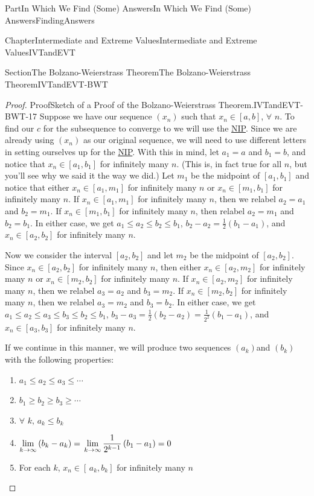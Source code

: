 \documentclass[oneside,10pt,]{book}
\numberwithin{equation}{part}
\begin{document}
\begin{partptx}{Part}{In Which We Find (Some) Answers}{}{In Which We Find (Some) Answers}{}{}{FindingAnswers}
\begin{chapterptx}{Chapter}{Intermediate and Extreme Values}{}{Intermediate and Extreme Values}{}{}{IVTandEVT}
\begin{sectionptx}{Section}{The Bolzano-Weierstrass Theorem}{}{The Bolzano-Weierstrass Theorem}{}{}{IVTandEVT-BWT}
\begin{proof}{Proof}{Sketch of a Proof of the Bolzano-Weierstrass Theorem.}{IVTandEVT-BWT-17}
Suppose we have our sequence \(\left(x_n\right)\) such that \(x_n\in[a,b]\), \(\forall\) \(n\). To find our \(c\) for the subsequence to converge to we will use the \hyperref[NIP]{NIP}. Since we are already using \(\left(x_n\right)\) as our original sequence, we will need to use different letters in setting ourselves up for the \hyperref[NIP]{NIP}. With this in mind, let \(a_1=a\) and \(b_1=b\), and notice that \(x_n\in[a_1,b_1]\) for infinitely many \(n\). (This is, in fact true for all \(n\), but you'll see why we said it the way we did.) Let \(m_1\) be the midpoint of \([a_1,b_1]\) and notice that either \(x_n\in[a_1,m_1]\) for infinitely many \(n\) or \(x_n\in[m_1,b_1]\) for infinitely many \(n\). If \(x_n\in[a_1,m_1]\) for infinitely many \(n\), then we relabel \(a_2=a_1\) and \(b_2=m_1\). If \(x_n\in[m_1,b_1]\) for infinitely many \(n\), then relabel \(a_2=m_1\) and \(b_2=b_1\). In either case, we get \(a_1\leq a_2\leq b_2\leq b_1\), \(b_2-a_2=\frac{1}{2}\left(b_1-a_1\right)\), and \(x_n\in[a_2,b_2]\) for infinitely many \(n\).%
\par
Now we consider the interval \([a_2,b_2]\) and let \(m_2\) be the midpoint of \([a_2,b_2]\). Since \(x_n\in[a_2,b_2]\) for infinitely many \(n\), then either \(x_n\in[a_2,m_2]\) for infinitely many \(n\) or \(x_n\in[m_2,b_2]\) for infinitely many \(n\). If \(x_n\in[a_2,m_2]\) for infinitely many \(n\), then we relabel \(a_3=a_2\) and \(b_3=m_2\). If \(x_n\in[m_2,b_2]\) for infinitely many \(n\), then we relabel \(a_3=m_2\) and \(b_3=b_2\). In either case, we get \(a_1\leq a_2\leq a_3\leq b_3\leq b_2\leq b_1\), \(b_3-a_3=\frac{1}{2}\left(b_2-a_2\right)=\frac{1}{2^2}\left(b_1-a_1\right)\), and \(x_n\in[a_3,b_3]\) for infinitely many \(n\).%
\par
If we continue in this manner, we will produce two sequences \(\left(a_k\right)\)and \(\left(b_k\right)\) with the following properties:%
\begin{enumerate}
\item{}\(\displaystyle a_1\leq a_2\leq a_3\leq\cdots\)%
\item{}\(\displaystyle b_1\geq b_2\geq b_3\geq\cdots\)%
\item{}\(\forall\) \(k,\,a_k\leq b_k\)%
\item{}\(\displaystyle \displaystyle\lim_{k\rightarrow\infty}\left(b_k-a_k\right)=\,\lim_{k\rightarrow\infty} \frac{1}{2^{k-1}}\left(b_1-a_1\right)=0\)%
\item{}For each \(k\), \(x_n\in[\,a_k,b_k]\) for infinitely many \(n\)%
\end{enumerate}

\end{proof}
\end{sectionptx}
\end{chapterptx}
\end{partptx}
\end{document}
